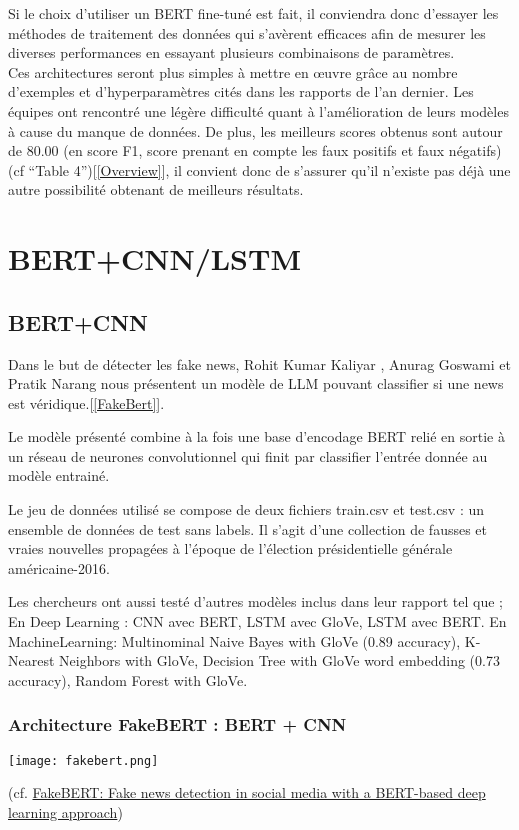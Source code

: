 \documentclass[11pt]{rapport_class}
\begin{document}
Si le choix d’utiliser un BERT fine-tuné est fait, il conviendra donc d’essayer les méthodes de traitement des données qui s'avèrent efficaces afin de mesurer les diverses performances en essayant plusieurs combinaisons de paramètres.\\
Ces architectures seront plus simples à mettre en œuvre grâce au nombre d’exemples et d'hyperparamètres cités dans les rapports de l’an dernier. Les équipes ont rencontré une légère difficulté quant à l’amélioration de leurs modèles à cause du manque de données. De plus, les meilleurs scores obtenus sont autour de 80.00 (en score F1, score prenant en compte les faux positifs et faux négatifs)(cf “Table 4”)[\ref{Overview}], il convient donc de s’assurer qu’il n’existe pas déjà une autre possibilité obtenant de meilleurs résultats.


    
\chapter{BERT+CNN/LSTM}
\section{BERT+CNN}
\qquad Dans le but de détecter les fake news, Rohit Kumar Kaliyar , Anurag Goswami et Pratik Narang nous présentent un modèle de LLM pouvant classifier si une news est véridique.[\ref{FakeBert}].

Le modèle présenté combine à la fois une base d’encodage BERT relié en sortie à un réseau de neurones convolutionnel qui finit par classifier l’entrée donnée au modèle entrainé.

Le jeu de données utilisé se compose de deux fichiers train.csv et test.csv : un ensemble de données de test sans labels. Il s'agit d'une collection de fausses et vraies nouvelles propagées à l'époque de l'élection présidentielle générale américaine-2016.

Les chercheurs ont aussi testé d’autres modèles inclus dans leur rapport tel que ; 
En Deep Learning : CNN avec BERT, LSTM avec GloVe, LSTM avec BERT.
En MachineLearning: Multinominal Naive Bayes with GloVe (0.89 accuracy), K-Nearest Neighbors with GloVe, Decision Tree with GloVe word embedding (0.73 accuracy), Random Forest with GloVe.

\begin{center}
\subsection {Architecture FakeBERT : BERT + CNN }
\texttt{[image: fakebert.png]}\\
\begin{tiny}
    (cf. \href{https://link.springer.com/article/10.1007/s11042-020-10183-2}{FakeBERT: Fake news detection in social media with a BERT-based deep learning approach})
\end{tiny}
\end{center}
\end{document}
